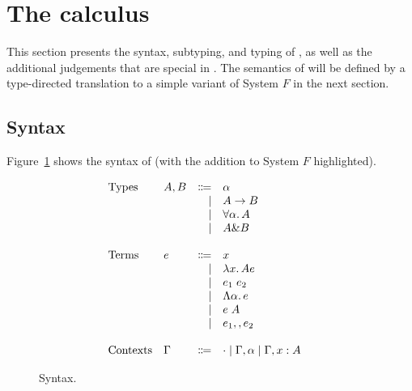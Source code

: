 \section{The \name calculus} \label{sec:fi}

This section presents the syntax, subtyping, and typing of \name, as well as the
additional judgements that are special in \name. The semantics of \name will be
defined by a type-directed translation to a simple variant of System $F$ in the
next section.

\subsection{Syntax}

Figure~\ref{fig:fi-syntax-old} shows the syntax of \name (with the addition to
System $F$ highlighted).


\begin{figure}
  \[
    \begin{array}{l}
      \begin{array}{llrll}
        \text{Types}
        & A, B & \Coloneqq & \alpha                  & \\
        &      & \mid & A \to B                      & \\
        &      & \mid & \forall \alpha.\, A  & \\
        &      & \mid & A \& B               & \\

        \\
        \text{Terms}
        & e & \Coloneqq & x                        & \\
        &   & \mid & \lambda x.\, A e                    & \\
        &   & \mid & e_1 \; e_2              & \\
        &   & \mid & \Lambda \alpha.\, e  & \\
        &   & \mid & e \; A                     & \\
        &   & \mid & e_1 ,, e_2              & \\

        \\
        \text{Contexts}
        & \Gamma & \Coloneqq & \cdot
                   \mid \Gamma, \alpha
                   \mid \Gamma, x : A  & \\
      \end{array}
    \end{array}
  \]

  \label{fig:fi-syntax-old}
  \caption{Syntax.}
\end{figure}

